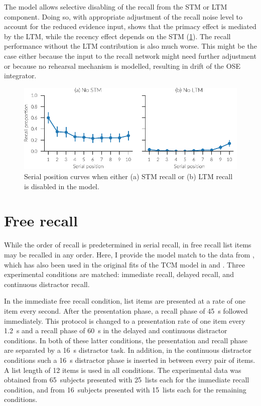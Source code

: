 The model allows selective disabling of the recall from the STM or LTM component.
Doing so, with appropriate adjustment of the recall noise level to account for the reduced evidence input, shows that the primacy effect is mediated by the LTM, while the recency effect depends on the STM (\cref{fig:results-no_xtm}).
The recall performance without the LTM contribution is also much worse.
This might be the case either because the input to the recall network might need further adjustment or because no rehearsal mechanism is modelled, resulting in drift of the OSE integrator.
\begin{figure}
    \centering
    \includegraphics{figures/results/no_xtm}
    \caption[Serial position curves with disabled STM/LTM.]{Serial position curves when either (a) STM recall or (b) LTM recall is disabled in the model.}\label{fig:results-no_xtm}
\end{figure}


\section{Free recall}
While the order of recall is predetermined in serial recall, in free recall list items may be recalled in any order.
Here, I provide the model match to the data from \textcite{Howard1999}, which has also been used in the original fits of the TCM model in \textcite{Howard2002} and \textcite{Sederberg2008}.
Three experimental conditions are matched: immediate recall, delayed recall, and continuous distractor recall.

In the immediate free recall condition, list items are presented at a rate of one item every second.
After the presentation phase, a recall phase of \SI{45}{\second} followed immediately.
This protocol is changed to a presentation rate of one item every \SI{1.2}{\second} and a recall phase of \SI{60}{\second} in the delayed and continuous distractor conditions.
In both of these latter conditions, the presentation and recall phase are separated by a \SI{16}{\second} distractor task.
In addition, in the continuous distractor conditions such a \SI{16}{\second} distractor phase is inserted in between every pair of items.
A list length of 12 items is used in all conditions.
The experimental data was obtained from \num{65}~subjects presented with \num{25}~lists each for the immediate recall condition, and from \num{16}~subjects presented with \num{15}~lists each for the remaining conditions.

